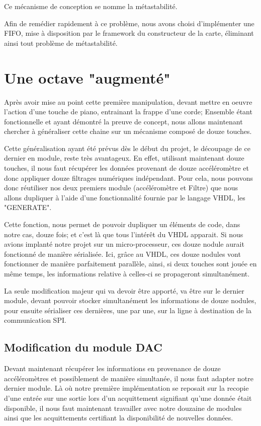 \documentclass[french,a4paper,12pt]{report}
\begin{document}
	Ce mécanisme de conception se nomme la métastabilité.
	
	Afin de remédier rapidement à ce problème, nous avons choisi d'implémenter une FIFO, mise à disposition par le framework du constructeur de la carte, éliminant ainsi tout problème de métastabilité.		
		
	\chapter{Une octave "augmenté"}
		Après avoir mise au point cette première manipulation, devant mettre en oeuvre l'action d'une touche de piano, entrainant la frappe d'une corde; Ensemble étant fonctionnelle et ayant démontré la preuve de concept, nous allons maintenant chercher à généraliser cette chaine sur un mécanisme composé de douze touches.
		
		Cette généralisation ayant été prévus dès le début du projet, le découpage de ce dernier en module, reste très avantageux. En effet, utilisant maintenant douze touches, il nous faut récupérer les données provenant de douze accéléromètre et donc appliquer douze filtrages numériques indépendant. Pour cela, nous pouvons donc réutiliser nos deux premiers module (accéléromètre et Filtre) que nous allons dupliquer à l'aide d'une fonctionnalité fournie par le langage VHDL, les "GENERATE".
		
		Cette fonction, nous permet de pouvoir dupliquer un éléments de code, dans notre cas, douze fois; et c'est là que tous l'intérêt du VHDL apparait. Si nous avions implanté notre projet sur un micro-processeur, ces douze nodule aurait fonctionné de manière sérialisée. Ici, grâce au VHDL, ces douze nodules vont fonctionner de manière parfaitement parallèle, ainsi, si deux touches sont jouée en même temps, les informations relative à celles-ci se propageront simultanément.
		
		La seule modification majeur qui va devoir être apporté, va être sur le dernier module, devant pouvoir stocker simultanément les informations de douze nodules, pour ensuite sérialiser ces dernières, une par une, sur la ligne à destination de la communication SPI.
		
		\newpage
		
	\section{Modification du module DAC}
		Devant maintenant récupérer les informations en provenance de douze accéléromètres et possiblement de manière simultanée, il nous faut adapter notre dernier module. Là où notre première implémentation se reposait sur la recopie d'une entrée sur une sortie lors d'un acquittement signifiant qu'une donnée était disponible, il nous faut maintenant travailler avec notre douzaine de modules ainsi que les acquittements certifiant la disponibilité de nouvelles données.
		
\end{document}
